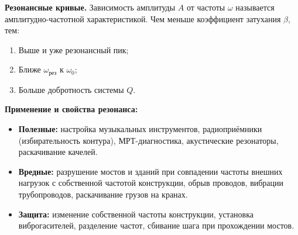 \begin{remark}
\textbf{Резонансные кривые.} Зависимость амплитуды $A$ от частоты $\omega$ называется амплитудно-частотной характеристикой. Чем меньше коэффициент затухания $\beta$, тем:
\begin{enumerate}
    \item Выше и уже резонансный пик;
    \item Ближе $\omega_{\text{рез}}$ к $\omega_0$;
    \item Больше добротность системы $Q$.
\end{enumerate}
\textbf{Применение и свойства резонанса:}
\begin{itemize}
    \item \textbf{Полезные:} настройка музыкальных инструментов, радиоприёмники (избирательность контура), МРТ-диагностика, акустические резонаторы, раскачивание качелей.
    \item \textbf{Вредные:} разрушение мостов и зданий при совпадении частоты внешних нагрузок с собственной частотой конструкции, обрыв проводов, вибрации трубопроводов, раскачивание грузов на кранах.
    \item \textbf{Защита:} изменение собственной частоты конструкции, установка виброгасителей, разделение частот, сбивание шага при прохождении мостов.
\end{itemize}
\end{remark}
